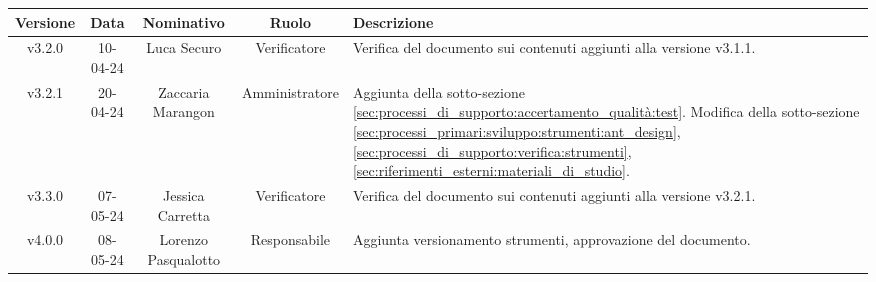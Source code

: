 \newpage
\begin{table}[h]
    \centering
    \renewcommand\tabularxcolumn[1]{m{#1}} %
    \renewcommand{\arraystretch}{1.5}
    \begin{tabularx}{0.98\textwidth}
        {c|c|c|c|>{\centering\arraybackslash}X}
        \rowcolor{black}
        \textbf{\color{white} Versione} & \textbf{\color{white} Data} & \textbf{\color{white} Nominativo} & \textbf{\color{white} Ruolo} & \textbf{\color{white} Descrizione} \\ 
        \hline
        v3.2.0 & 10-04-24 & Luca Securo & Verificatore & Verifica del documento sui contenuti aggiunti alla versione v3.1.1.\\
        v3.2.1 & 20-04-24 & Zaccaria Marangon & Amministratore & Aggiunta della sotto-sezione \ref{sec:processi_di_supporto:accertamento_qualità:test}. Modifica della sotto-sezione \ref{sec:processi_primari:sviluppo:strumenti:ant_design}, \ref{sec:processi_di_supporto:verifica:strumenti}, \ref{sec:riferimenti_esterni:materiali_di_studio}.\\
        v3.3.0 & 07-05-24 & Jessica Carretta & Verificatore & Verifica del documento sui contenuti aggiunti alla versione v3.2.1.\\
        v4.0.0 & 08-05-24 & Lorenzo Pasqualotto & Responsabile & Aggiunta versionamento strumenti, approvazione del documento.\\
        \hline
    \end{tabularx}
\end{table}